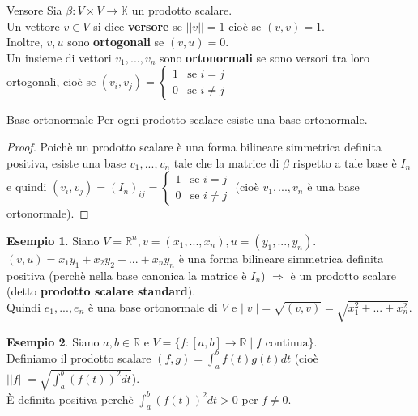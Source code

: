 \documentclass[a4paper]{article}
\theoremstyle{definition}
\newtheorem*{es}{Esempio}
\begin{document}
	\begin{deff}{Versore}{}
		Sia $\beta: V \times V \to \mathbb{K}$ un prodotto scalare. \\
		Un vettore $v \in V$ si dice \textbf{versore} se $||v|| = 1$ cioè se $(v, v) = 1$. \\
		Inoltre, $v, u$ sono \textbf{ortogonali} se $(v, u) = 0$. \\
		Un insieme di vettori $v_1, ..., v_n$ sono \textbf{ortonormali} se sono versori tra loro ortogonali,
		cioè se $(v_i, v_j) = \begin{cases}
			1 & \text{se } i = j \\
			0 & \text{se } i \ne j
		\end{cases}$
	\end{deff}

	\begin{teo}{Base ortonormale}{}
		Per ogni prodotto scalare esiste una base ortonormale.
	\end{teo}
	\begin{proof}
		Poichè un prodotto scalare è una forma bilineare simmetrica definita positiva, esiste una base $v_1, ..., v_n$ tale che la matrice di $\beta$ rispetto a tale base è $I_n$ e quindi $(v_i, v_j) = (I_n)_{ij} = \begin{cases}
			1 & \text{se } i = j \\
			0 & \text{se } i \ne j
		\end{cases}$ (cioè $v_1, ..., v_n$ è una base ortonormale).
	\end{proof}

	\begin{es}
		Siano $V = \mathbb{R}^n, v = (x_1, ..., x_n), u = (y_1, ..., y_n)$. \\
		$(v, u) = x_1y_1 + x_2y_2 + ... + x_ny_n$ è una forma bilineare simmetrica definita positiva (perchè nella base canonica la matrice è $I_n$) $\Rightarrow$ è un prodotto scalare (detto \textbf{prodotto scalare standard}). \\
		Quindi $e_1, ..., e_n$ è una base ortonormale di $V$ e $||v|| = \sqrt{(v, v)} = \sqrt{x_1^2 + ... + x_n^2}$.
	\end{es}

	\begin{es}
		Siano $a, b \in \mathbb{R}$ e $V = \{f: [a, b] \to \mathbb{R} \mid f \text{ continua}\}$. \\
		Definiamo il prodotto scalare $(f, g) = \int_a^b f(t)g(t)dt$ (cioè $||f|| = \sqrt{\int_a^b (f(t))^2 dt}$). \\
		È definita positiva perchè $\int_a^b (f(t))^2 dt > 0$ per $f \ne 0$.
	\end{es}
\end{document}

